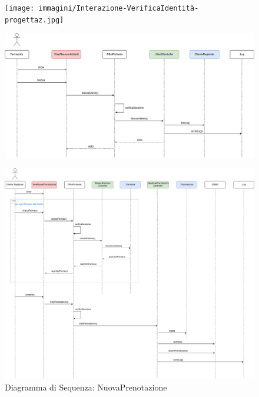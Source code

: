 \newpage

\begin{figure}[h!]
    \begin{center}
        \texttt{[image: immagini/Interazione-VerificaIdentità-progettaz.jpg]}
    \end{center}
\end{figure}

\begin{figure}[h!]
    \begin{center}
        \includegraphics[width=\textwidth]{immagini/Interazione-SospensioneUtenza-progettaz.jpg}
    \end{center}
\end{figure}


\newpage

\begin{figure}[h!]
    \begin{center}
        \includegraphics[width=\textwidth]{immagini/Interazione-NuovaPrenotazione-progettaz.jpg}
        \caption{Diagramma di Sequenza: NuovaPrenotazione}
    \end{center}
\end{figure}

